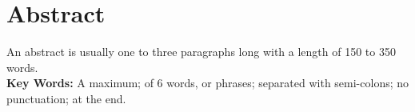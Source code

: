 \chapter*{Abstract}
An abstract is usually one to three paragraphs long with a length of 150 to 350 words.\\

\noindent
{\fontsize{11}{13.2}\selectfont \textbf{Key Words:} A maximum; of 6 words, or phrases; separated with semi-colons; no punctuation; at the end.}